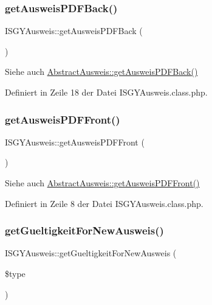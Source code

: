 \subsubsection{\texorpdfstring{get\+Ausweis\+P\+D\+F\+Back()}{getAusweisPDFBack()}}
{\footnotesize\ttfamily I\+S\+G\+Y\+Ausweis\+::get\+Ausweis\+P\+D\+F\+Back (\begin{DoxyParamCaption}{ }\end{DoxyParamCaption})}

\begin{DoxySeeAlso}{Siehe auch}
\mbox{\hyperlink{class_abstract_ausweis_abc559bd235762d0234c25dcea44a8730}{Abstract\+Ausweis\+::get\+Ausweis\+P\+D\+F\+Back()}} 
\end{DoxySeeAlso}


Definiert in Zeile 18 der Datei I\+S\+G\+Y\+Ausweis.\+class.\+php.

\mbox{\label{class_i_s_g_y_ausweis_a4f56590788332c4c0d96f4ff623992e3}} 
\subsubsection{\texorpdfstring{get\+Ausweis\+P\+D\+F\+Front()}{getAusweisPDFFront()}}
{\footnotesize\ttfamily I\+S\+G\+Y\+Ausweis\+::get\+Ausweis\+P\+D\+F\+Front (\begin{DoxyParamCaption}{ }\end{DoxyParamCaption})}

\begin{DoxySeeAlso}{Siehe auch}
\mbox{\hyperlink{class_abstract_ausweis_a7c65e02f1291567ab17484537a8fb2fe}{Abstract\+Ausweis\+::get\+Ausweis\+P\+D\+F\+Front()}} 
\end{DoxySeeAlso}


Definiert in Zeile 8 der Datei I\+S\+G\+Y\+Ausweis.\+class.\+php.

\mbox{\label{class_i_s_g_y_ausweis_a0fae384f710baf7cb0789b8c91f6ebde}} 
\subsubsection{\texorpdfstring{get\+Gueltigkeit\+For\+New\+Ausweis()}{getGueltigkeitForNewAusweis()}}
{\footnotesize\ttfamily I\+S\+G\+Y\+Ausweis\+::get\+Gueltigkeit\+For\+New\+Ausweis (\begin{DoxyParamCaption}\item[{}]{\$type }\end{DoxyParamCaption})}

